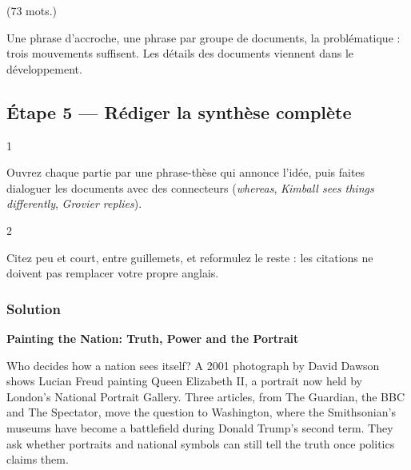 \documentclass[11pt,a4paper]{article}
\begin{document}
(73 mots.)

\begin{methode}

Une phrase d'accroche, une phrase par groupe de documents, la problématique : trois mouvements suffisent. Les détails des documents viennent dans le développement.

\end{methode}

\hypertarget{uxe9tape-5-ruxe9diger-la-synthuxe8se-compluxe8te}{%
\subsection{Étape 5 --- Rédiger la synthèse complète}\label{uxe9tape-5-ruxe9diger-la-synthuxe8se-compluxe8te}}

\begin{indication}{1}

Ouvrez chaque partie par une phrase-thèse qui annonce l'idée, puis faites dialoguer les documents avec des connecteurs (\emph{whereas}, \emph{Kimball sees things differently}, \emph{Grovier replies}).

\end{indication}

\begin{indication}{2}

Citez peu et court, entre guillemets, et reformulez le reste : les citations ne doivent pas remplacer votre propre anglais.

\end{indication}

\hypertarget{solution-4}{%
\subsubsection{Solution}\label{solution-4}}

\textbf{Painting the Nation: Truth, Power and the Portrait}

Who decides how a nation sees itself? A 2001 photograph by David Dawson shows Lucian Freud painting Queen Elizabeth II, a portrait now held by London's National Portrait Gallery. Three articles, from The Guardian, the BBC and The Spectator, move the question to Washington, where the Smithsonian's museums have become a battlefield during Donald Trump's second term. They ask whether portraits and national symbols can still tell the truth once politics claims them.
\end{document}
